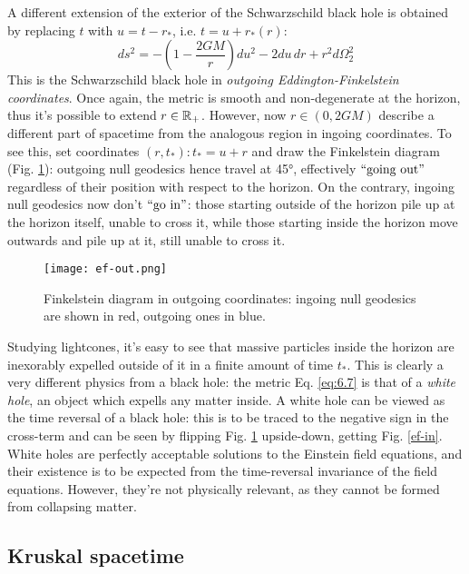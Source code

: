 A different extension of the exterior of the Schwarzschild black hole is obtained by replacing $ t $ with $ u = t - r_* $, i.e. $ t = u + r_*(r) $:
\begin{equation}
  ds^2 = - \left( 1 - \frac{2GM}{r} \right) du^2 -2 du\,dr + r^2 d\Omega_2^2
  \label{eq:6.7}
\end{equation}
This is the Schwarzschild black hole in \textit{outgoing Eddington-Finkelstein coordinates}. Once again, the metric is smooth and non-degenerate at the horizon, thus it's possible to extend $ r \in \mathbb{R}_+ $. However, now $ r \in (0,2GM) $ describe a different part of spacetime from the analogous region in ingoing coordinates. To see this, set coordinates $ (r,t_*) : t_* = u + r $ and draw the Finkelstein diagram (Fig. \ref{ef-out}): outgoing null geodesics hence travel at 45°, effectively $ ``\text{going out}" $ regardless of their position with respect to the horizon. On the contrary, ingoing null geodesics now don't $ ``\text{go in}" $: those starting outside of the horizon pile up at the horizon itself, unable to cross it, while those starting inside the horizon move outwards and pile up at it, still unable to cross it.

\begin{figure}
  \centering
  \texttt{[image: ef-out.png]}
  \caption{Finkelstein diagram in outgoing coordinates: ingoing null geodesics are shown in red, outgoing ones in blue.}
  \label{ef-out}
\end{figure}

Studying lightcones, it's easy to see that massive particles inside the horizon are inexorably expelled outside of it in a finite amount of time $ t_* $. This is clearly a very different physics from a black hole: the metric Eq. \ref{eq:6.7} is that of a \textit{white hole}, an object which expells any matter inside. A white hole can be viewed as the time reversal of a black hole: this is to be traced to the negative sign in the cross-term and can be seen by flipping Fig. \ref{ef-out} upside-down, getting Fig. \ref{ef-in}.\\
White holes are perfectly acceptable solutions to the Einstein field equations, and their existence is to be expected from the time-reversal invariance of the field equations. However, they're not physically relevant, as they cannot be formed from collapsing matter.

\subsection{Kruskal spacetime}

